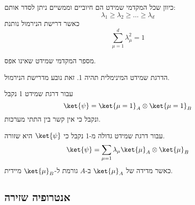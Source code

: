 \documentclass{tstextbook}
\begin{document}
\begin{proposition}
כיוון שכל המקדמי שמידט הם חיוביים וממשיים ניתן לסדר אותם:
$$\lambda_{1}\geq \lambda_{2} \geq \dots \geq \lambda_{d}$$
כאשר דרישת הנירמול נותנת
$$\sum_{\mu=1}^{d} \lambda_{\mu}^{2}=1$$

\end{proposition}
\begin{definition}
מספר המקדמי שמידט שאינו אפס.

\end{definition}
\begin{remark}
הדרגת שמידט המינימלית תהיה 1. זאת נובע מדרישת הנירמול.

\end{remark}
\begin{proposition}
עבור דרגת שמידט 1 נקבל
$$\ket{\psi} = \ket{\mu=1}_{A} \otimes \ket{\mu=1}_{B}$$
ונקבל כי אין קשר בין התתי מערכות.

\end{proposition}
\begin{proposition}
עבור דרגת שמידט גדולה מ-1 נקבל כי \(\ket{\psi}\) היא שזורה.
$$\ket{\psi} =\sum_{\mu=1} \lambda_{\mu} \ket{\mu}_{A}\otimes \ket{\mu}_{B}   $$
כאשר מדידה של \(\ket{\mu}_{A}\) ב-\(A\) גורמת ל-\(\ket{\mu}_{B}\) מיידית.

\end{proposition}
\subsection{אנטרופיה שזירה}
\end{document}
